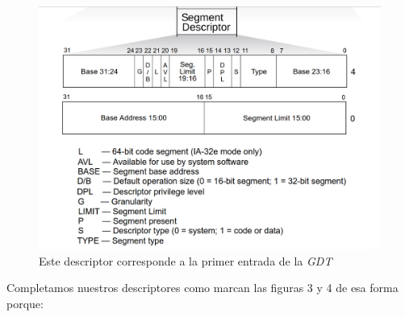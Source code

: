 \begin{figure}[H]
\begin{center}
  \includegraphics[width=\linewidth]{ejercicio1/estructuradescriptor.png}
  \caption{{\small Este descriptor corresponde a la primer entrada de la \textit{GDT}}} 
\endminipage
\end{center}
\end{figure}

Completamos nuestros descriptores como marcan las figuras 3 y 4 de esa forma porque:

